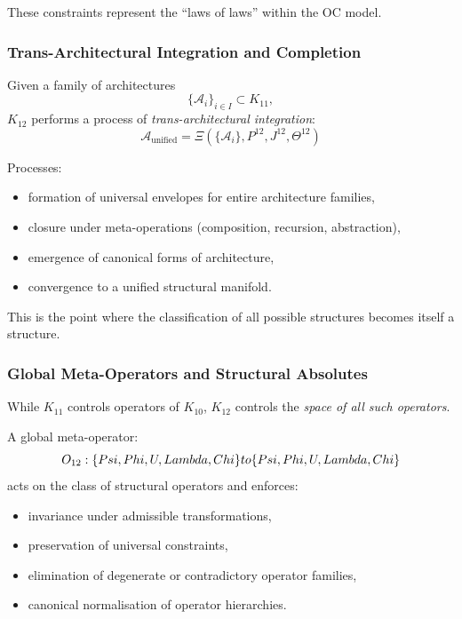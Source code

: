 These constraints represent the ``laws of laws'' within the OC model.

\subsubsection{Trans-Architectural Integration and Completion}

Given a family of architectures
\[
\{\mathcal{A}_i\}_{i \in I} \subset K_{11},
\]
$K_{12}$ performs a process of \emph{trans-architectural integration}:
\[
\mathcal{A}_{\text{unified}}
= \Xi(\{\mathcal{A}_i\}, P^{12}, J^{12}, \Theta^{12})
\]

Processes:
\begin{itemize}
    \item formation of universal envelopes for entire architecture families,
    \item closure under meta-operations (composition, recursion, abstraction),
    \item emergence of canonical forms of architecture,
    \item convergence to a unified structural manifold.
\end{itemize}

This is the point where the classification of all possible structures becomes
itself a structure.

\subsubsection{Global Meta-Operators and Structural Absolutes}

While $K_{11}$ controls operators of $K_{10}$,
$K_{12}$ controls the \emph{space of all such operators}.

A global meta-operator:
\[
O_{12} :
\{Psi, Phi, U, Lambda, Chi\}
to
\{Psi, Phi, U, Lambda, Chi\}
\]
acts on the class of structural operators and enforces:
\begin{itemize}
    \item invariance under admissible transformations,
    \item preservation of universal constraints,
    \item elimination of degenerate or contradictory operator families,
    \item canonical normalisation of operator hierarchies.
\end{itemize}

